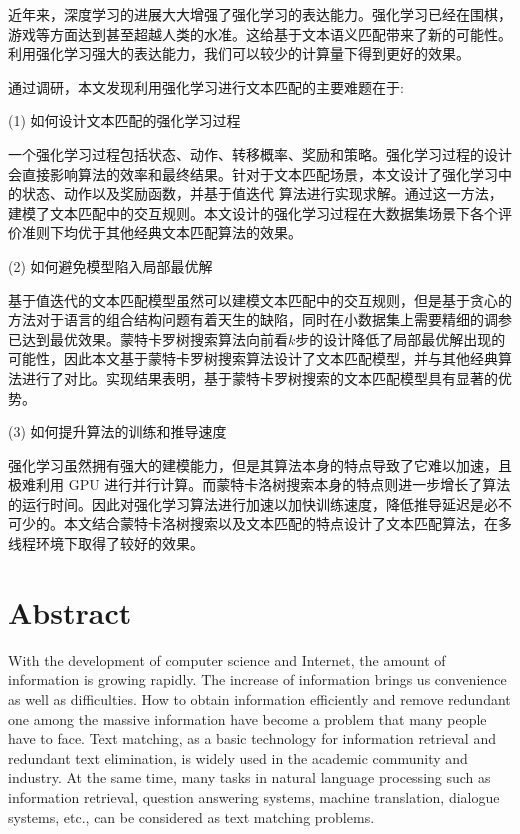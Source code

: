 近年来，深度学习的进展大大增强了强化学习的表达能力。强化学习已经在围棋，游戏等方面达到甚至超越人类的水准。这给基于文本语义匹配带来了新的可能性。利用强化学习强大的表达能力，我们可以较少的计算量下得到更好的效果。

通过调研，本文发现利用强化学习进行文本匹配的主要难题在于:

(1) 如何设计文本匹配的强化学习过程

一个强化学习过程包括状态、动作、转移概率、奖励和策略。强化学习过程的设计会直接影响算法的效率和最终结果。针对于文本匹配场景，本文设计了强化学习中的状态、动作以及奖励函数，并基于值迭代 算法进行实现求解。通过这一方法，建模了文本匹配中的交互规则。本文设计的强化学习过程在大数据集场景下各个评价准则下均优于其他经典文本匹配算法的效果。

(2) 如何避免模型陷入局部最优解

基于值迭代的文本匹配模型虽然可以建模文本匹配中的交互规则，但是基于贪心的方法对于语言的组合结构问题有着天生的缺陷，同时在小数据集上需要精细的调参已达到最优效果。蒙特卡罗树搜索算法向前看$k$步的设计降低了局部最优解出现的可能性，因此本文基于蒙特卡罗树搜索算法设计了文本匹配模型，并与其他经典算法进行了对比。实现结果表明，基于蒙特卡罗树搜索的文本匹配模型具有显著的优势。

(3) 如何提升算法的训练和推导速度

强化学习虽然拥有强大的建模能力，但是其算法本身的特点导致了它难以加速，且极难利用 GPU 进行并行计算。而蒙特卡洛树搜索本身的特点则进一步增长了算法的运行时间。因此对强化学习算法进行加速以加快训练速度，降低推导延迟是必不可少的。本文结合蒙特卡洛树搜索以及文本匹配的特点设计了文本匹配算法，在多线程环境下取得了较好的效果。

\chapter*{Abstract}

With the development of computer science and Internet, the amount of information is growing rapidly. The increase of information brings us convenience as well as difficulties. How to obtain information efficiently and remove redundant one among the massive information have become a problem that many people have to face. Text matching, as a basic technology for information retrieval and redundant text elimination, is widely used in the academic community and industry. At the same time, many tasks in natural language processing such as information retrieval, question answering systems, machine translation, dialogue systems, etc., can be considered as text matching problems.

